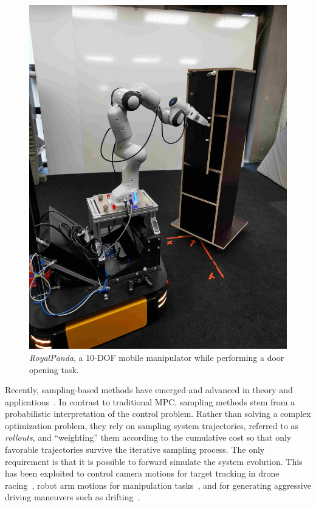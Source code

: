 \begin{figure}[t]
\centering
\includegraphics[trim={0 500 0 800},clip,width=0.8\columnwidth]{framework_manipulation/figures/hardware/system_figure_new.jpg}
\caption{\textit{RoyalPanda}, a 10-DOF mobile manipulator while performing a door opening task.} \label{fig:royal_panda}
\end{figure}

Recently, sampling-based methods have emerged and advanced in theory and applications~\cite{lee_aggressive_2020,abraham_model-based_2020,williams_information_nodate,williams_information_2017,rajamaki_augmenting_2017}. 
In contrast to traditional MPC, sampling methods stem from a probabilistic interpretation of the control problem. 
Rather than solving a complex optimization problem, they rely on sampling system trajectories, referred to as \textit{rollouts}, and ``weighting'' them according to the cumulative cost so that only favorable trajectories survive the iterative sampling process. The only requirement is that it is possible to forward simulate the system evolution. This has been exploited to control camera motions for target tracking in drone racing~\cite{lee_aggressive_2020}, robot arm motions for manipulation tasks~\cite{abraham_model-based_2020}, and for generating aggressive driving maneuvers such as drifting~\cite{williams_information_nodate, williams_information_2017}. 

